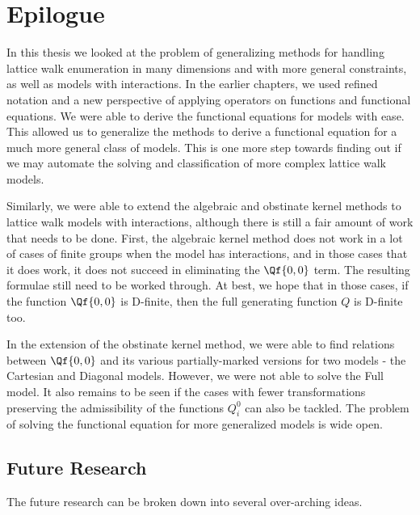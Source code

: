 
\chapter{Epilogue}
\label{ch:Epilogue}

In this thesis we looked at the problem of generalizing methods for handling lattice walk enumeration in many dimensions and with more general constraints, as well as models with interactions. In the earlier chapters, we used refined notation and a new perspective of applying operators on functions and functional equations. We were able to derive the functional equations for \classic \dD models with ease. This allowed us to generalize the methods to derive a functional equation for a much more general class of models. This is one more step towards finding out if we may automate the solving and classification of more complex lattice walk models. 

Similarly, we were able to extend the algebraic and obstinate kernel methods to lattice walk models with interactions, although there is still a fair amount of work that needs to be done. First, the algebraic kernel method does not work in a lot of cases of finite groups when the model has interactions, and in those cases that it does work, it does not succeed in eliminating the $\Qf{0,0}$ term. The resulting formulae still need to be worked through. At best, we hope that in those cases, if the function $\Qf{0,0}$ is D-finite, then the full generating function $Q$ is D-finite too. 

In the extension of the obstinate kernel method, we were able to find relations between $\Qf{0,0}$ and its various partially-marked versions for two models - the Cartesian and Diagonal models. However, we were not able to solve the Full model. It also remains to be seen if the cases with fewer transformations preserving the admissibility of the functions $Q_i^0$ can also be tackled. The problem of solving the functional equation for more generalized models is wide open.

\section{Future Research}

The future research can be broken down into several over-arching ideas. 

